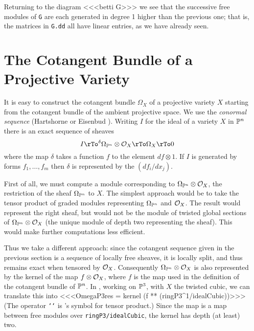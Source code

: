 Returning to the diagram
<<<betti G>>>
we see that the successive free modules of {\tt G} are 
each generated in degree 1 higher than the previous one; that
is, the matrices in {\tt G.dd} all have linear entries, as
we have already seen.




\section{The Cotangent Bundle of a Projective Variety}

%
It is easy to construct the cotangent bundle $\Omega_X$ of a projective
variety $X$ starting from the cotangent bundle 
of the ambient
projective space. We use the {\it conormal sequence}
(Hartshorne \cite[Proposition II.8.12]{Hartshorne} or Eisenbud
\cite[Proposition 16.3]{eCA}).
Writing $I$ for the ideal of a variety $X$ in $\P^n$ there is
an exact sequence of sheaves
$$
I \rTo^\delta \Omega_{\P^n}\otimes \cO_X\rTo \Omega_X\rTo 0
$$
where the map $\delta$ takes a function $f$
to the element $df\otimes 1$. If $I$ is generated by 
{}forms $f_1,\dots,f_m$ then $\delta$ is represented
by the  $(df_i/dx_j)$. 


{}First of all, we must compute a module corresponding to
$\Omega_{\P^n}\otimes \cO_X$, the restriction of the sheaf
$\Omega_{\P^n}$ to $X$. The simplest approach would be
to take the tensor product of graded modules representing
$\Omega_{\P^n}$ and  $\cO_X$. The result would represent the
right sheaf, but would not be the module of twisted global
sections of $\Omega_{\P^n}\otimes \cO_X$ (the unique module
of depth two representing the sheaf). This would make further
computations less efficient. 

Thus we take a different approach:
since the cotangent sequence given 
in the previous section
is a sequence of locally free sheaves, it is locally split, and
thus remains exact when tensored by $\cO_X$. Consequently
$\Omega_{\P^n}\otimes \cO_X$ is also represented by the kernel
of the map $f\otimes  \cO_X$, where $f$ is the map used
in the definition of the cotangent bundle of $\P^n$.
In \Mtwo, working on $\P^3$, with $X$ the twisted cubic, we
can translate this into
<<<OmegaP3res = kernel (f ** (ringP3^1/idealCubic))>>>
(The operator {\tt \char`\*\char`\*} is \Mtwo's symbol for tensor product.)
Since the map is a map between free modules
over {\tt ringP3/idealCubic}, the kernel has depth (at least) two.


